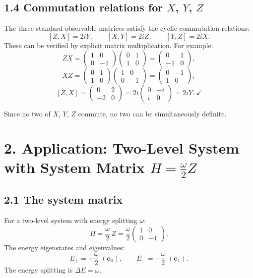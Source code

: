 \documentclass[12pt,a4paper]{article}
\begin{document}
\subsection{1.4 Commutation relations for $X$, $Y$, $Z$}
The three standard observable matrices satisfy the cyclic commutation relations:
\[
    \boxed{[Z,X] = 2iY, \qquad
    [X,Y] = 2iZ, \qquad
    [Y,Z] = 2iX.}
\]
These can be verified by explicit matrix multiplication.  For example:
\[
    ZX = \begin{pmatrix}1&0\\0&-1\end{pmatrix}\begin{pmatrix}0&1\\1&0\end{pmatrix} = \begin{pmatrix}0&1\\-1&0\end{pmatrix},
\]
\[
    XZ = \begin{pmatrix}0&1\\1&0\end{pmatrix}\begin{pmatrix}1&0\\0&-1\end{pmatrix} = \begin{pmatrix}0&-1\\1&0\end{pmatrix},
\]
\[
    [Z,X] = \begin{pmatrix}0&2\\-2&0\end{pmatrix} = 2i\begin{pmatrix}0&-i\\i&0\end{pmatrix} = 2iY.\;\checkmark
\]

Since no two of $X$, $Y$, $Z$ commute, no two can be simultaneously definite.

\section{2. Application: Two-Level System with System Matrix $H = \frac{\omega}{2}Z$}

\subsection{2.1 The system matrix}
For a two-level system with energy splitting $\omega$:
\[
    H = \frac{\omega}{2}\,Z = \frac{\omega}{2}\begin{pmatrix}1&0\\0&-1\end{pmatrix}.
\]
The energy eigenstates and eigenvalues:
\[
    E_+ = +\frac{\omega}{2}\;(\mathbf{e}_0), \qquad
    E_- = -\frac{\omega}{2}\;(\mathbf{e}_1).
\]
The energy splitting is $\Delta E = \omega$.
\end{document}
